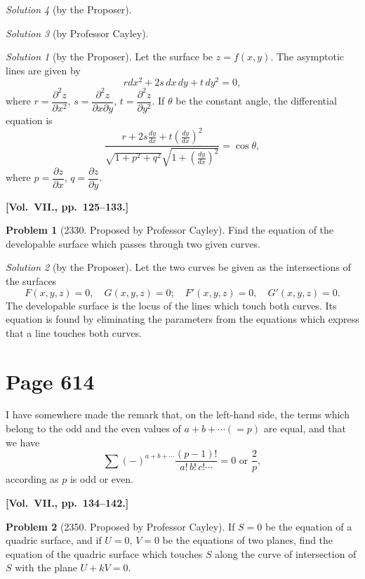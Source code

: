 \documentclass[12pt,a4paper]{article}
\theoremstyle{plain}
\theoremstyle{definition}
\newtheorem{problem}{Problem}
\theoremstyle{remark}
\newtheorem*{solution}{Solution}
\begin{document}
\begin{solution}[by the Proposer]
\begin{solution}[by Professor Cayley]
\begin{solution}[by the Proposer]
Let the surface be $z = f(x, y)$. The asymptotic lines are given by
\[
rdx^2 + 2s\,dx\,dy + t\,dy^2 = 0,
\]
where $r = \dfrac{\partial^2 z}{\partial x^2}$, $s = \dfrac{\partial^2 z}{\partial x\partial y}$, $t = \dfrac{\partial^2 z}{\partial y^2}$. If $\theta$ be the constant angle, the differential equation is
\[
\frac{r + 2s\frac{dy}{dx} + t\left(\frac{dy}{dx}\right)^2}{\sqrt{1 + p^2 + q^2}\sqrt{1 + \left(\frac{dy}{dx}\right)^2}} = \cos\theta,
\]
where $p = \dfrac{\partial z}{\partial x}$, $q = \dfrac{\partial z}{\partial y}$.
\end{solution}

\medskip\noindent\textbf{[Vol.~VII., pp.~125--133.]}

\begin{problem}[2330. Proposed by Professor Cayley]
Find the equation of the developable surface which passes through two given curves.
\end{problem}

\begin{solution}[by the Proposer]
Let the two curves be given as the intersections of the surfaces
\[
F(x, y, z) = 0, \quad G(x, y, z) = 0; \quad
F'(x, y, z) = 0, \quad G'(x, y, z) = 0.
\]
The developable surface is the locus of the lines which touch both curves. Its equation is found by eliminating the parameters from the equations which express that a line touches both curves.
\end{solution}

\section*{Page 614}
\setcounter{page}{614}

I have somewhere made the remark that, on the left-hand side, the terms which belong to the odd and the even values of $a + b + \cdots (= p)$ are equal, and that we have
\[
\sum (-)^{a+b+\cdots} \frac{(p - 1)!}{a!\,b!\,c!\cdots} = 0 \text{ or } \frac{2}{p},
\]
according as $p$ is odd or even.

\medskip\noindent\textbf{[Vol.~VII., pp.~134--142.]}

\begin{problem}[2350. Proposed by Professor Cayley]
If $S = 0$ be the equation of a quadric surface, and if $U = 0$, $V = 0$ be the equations of two planes, find the equation of the quadric surface which touches $S$ along the curve of intersection of $S$ with the plane $U + kV = 0$.
\end{problem}


\end{solution}
\end{solution}
\end{document}
